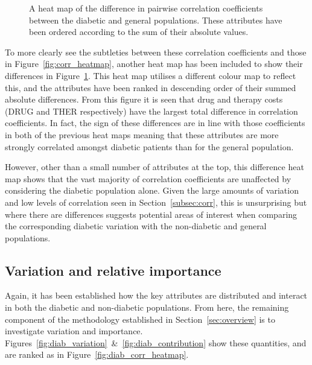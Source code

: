 \begin{figure}[htbp]
    \caption{A heat map of the difference in pairwise correlation coefficients
        between the diabetic and general populations. These attributes have been
        ordered according to the sum of their absolute values.}%
    \label{fig:diab_corr_difference}
\end{figure}

To more clearly see the subtleties between these correlation coefficients and
those in Figure~\ref{fig:corr_heatmap}, another heat map has been included to
show their differences in Figure~\ref{fig:diab_corr_difference}. This heat
map utilises a different colour map to reflect this, and the attributes have
been ranked in descending order of their summed absolute differences. From this
figure it is seen that drug and therapy costs (DRUG and THER respectively) have
the largest total difference in correlation coefficients. In fact, the sign of
these differences are in line with those coefficients in both of the previous
heat maps meaning that these attributes are more strongly correlated amongst
diabetic patients than for the general population.

However, other than a small number of attributes at the top, this difference
heat map shows that the vast majority of correlation coefficients are unaffected
by considering the diabetic population alone. Given the large amounts of
variation and low levels of correlation seen in Section~\ref{subsec:corr}, this
is unsurprising but where there are differences suggests potential areas of
interest when comparing the corresponding diabetic variation with the
non-diabetic and general populations.


\subsection{Variation and relative importance}\label{subsec:diab_variation}

Again, it has been established how the key attributes are distributed and
interact in both the diabetic and non-diabetic populations. From here, the 
remaining component of the methodology established in Section~\ref{sec:overview}
is to investigate variation and importance.
Figures~\ref{fig:diab_variation}~\&~\ref{fig:diab_contribution} show these
quantities, and are ranked as in Figure~\ref{fig:diab_corr_heatmap}.

